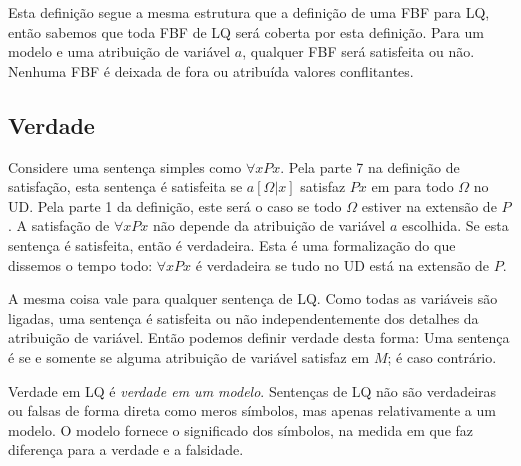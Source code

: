 Esta definição segue a mesma estrutura que a definição de uma FBF para LQ, então sabemos que toda FBF de LQ será coberta por esta definição. Para um modelo  e uma atribuição de variável $a$, qualquer FBF será satisfeita ou não. Nenhuma FBF é deixada de fora ou atribuída valores conflitantes.

\subsection{Verdade}

Considere uma sentença simples como $\forall xPx$. Pela parte 7 na definição de satisfação, esta sentença é satisfeita se $a[\Omega|x]$ satisfaz $Px$ em  para todo $\Omega$ no UD. Pela parte 1 da definição, este será o caso se todo $\Omega$ estiver na extensão de $P$. A satisfação de $\forall xPx$ não depende da atribuição de variável $a$ escolhida. Se esta sentença é satisfeita, então é verdadeira. Esta é uma formalização do que dissemos o tempo todo: $\forall xPx$ é verdadeira se tudo no UD está na extensão de $P$.

A mesma coisa vale para qualquer sentença de LQ. Como todas as variáveis são ligadas, uma sentença é satisfeita ou não independentemente dos detalhes da atribuição de variável. Então podemos definir verdade desta forma: Uma sentença  é   se e somente se alguma atribuição de variável satisfaz  em $M$;  é   caso contrário.

Verdade em LQ é \emph{verdade em um modelo}. Sentenças de LQ não são verdadeiras ou falsas de forma direta como meros símbolos, mas apenas relativamente a um modelo. O modelo fornece o significado dos símbolos, na medida em que faz diferença para a verdade e a falsidade.

